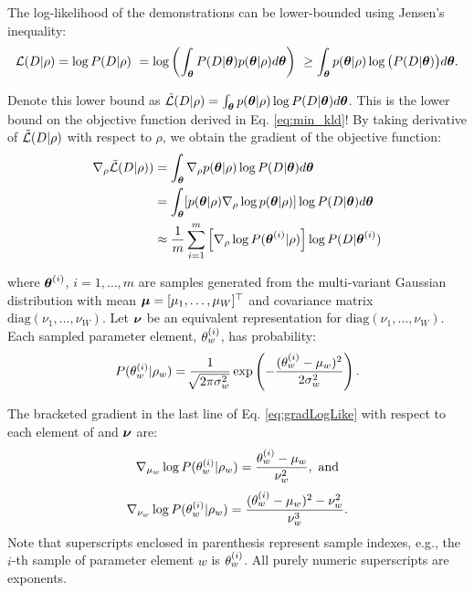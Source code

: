     \noindent
     The log-likelihood of the demonstrations can be lower-bounded using Jensen's inequality:
    \begin{equation*}
    \mathcal{L}(D|\rho ) = \log P(D|\rho)\
         = \log \left( \int_{\boldsymbol{\mathbb{\theta}}}P(D|\boldsymbol{\mathbb{\theta}}) p(\boldsymbol{\mathbb{\theta}} | \rho)d\boldsymbol{\mathbb{\theta}} \right)\ \ge \int_{\boldsymbol{\mathbb{\theta}}}
            p(\boldsymbol{\mathbb{\theta}}|\rho)\log \big( P(D|\boldsymbol{\mathbb{\theta}}) \big) d\boldsymbol{\mathbb{\theta}}.
    \end{equation*}

    \par
    Denote this lower bound as $\tilde{\mathcal{L}}(D|\rho)=\int_{\boldsymbol{\mathbb{\theta}}} p(\boldsymbol{\mathbb{\theta}} |\rho) \log P(D|\boldsymbol{\mathbb{\theta}})
    d\boldsymbol{\mathbb{\theta}}$. This is the lower bound on the objective function derived in Eq. \ref{eq:min_kld}! By taking
    derivative of $\tilde{\mathcal{L}}(D|\rho)$ with respect to $\rho$, we obtain the gradient of the objective function:
    \begin{equation}\label{eq:gradLogLike}
        \begin{aligned}
            \nabla_\rho \tilde{\mathcal{L}}(D|\rho)) & =
                \int_{\boldsymbol{\mathbb{\theta}}}\nabla_\rho p(\boldsymbol{\mathbb{\theta}}|\rho) \log P(D|\boldsymbol{\mathbb{\theta}})d\boldsymbol{\mathbb{\theta}}\\
            & = \int_{\boldsymbol{\mathbb{\theta}}}[ p(\boldsymbol{\mathbb{\theta}}|\rho) \nabla_\rho \log p(\boldsymbol{\mathbb{\theta}}|\rho) ] \log P(D|\boldsymbol{\mathbb{\theta}})d\boldsymbol{\mathbb{\theta}}\\
            &\approx \frac{1}{m} \sum_{ i=1}^m \left[\nabla_\rho \log P(\boldsymbol{\mathbb{\theta}}^{(i)}|\rho) \right] \log
                P(D|\boldsymbol{\mathbb{\theta}}^{(i)})
        \end{aligned}
    \end{equation}

    \noindent
    where $\boldsymbol{\mathbb{\theta}}^{(i)}$, $i=1,\ldots, m$ are samples generated from the multi-variant Gaussian distribution with
    mean $\boldsymbol{\mathbb{\mu}} = [\mu_1,\ldots, \mu_W]^\top$ and covariance matrix $\mbox{diag}\left(\nu_1,\ldots, \nu_W\right)$.
    Let $\boldsymbol{\mathbb{\nu}}$ be an equivalent representation for $\mbox{diag}\left(\nu_1,\ldots, \nu_W\right)$. Each sampled
    parameter element, $\theta_{w}^{(i)}$, has probability:
    \[
        P(\theta_{w}^{(i)} | \rho_{w}) = \frac{1}{\sqrt[]{2\pi \sigma_w^2}}\exp
            \left( -\frac{(\theta_w^{(i)}-\mu_w)^2}{2\sigma_w^2} \right).
    \]

    \par
    The bracketed gradient in the last line of Eq. \ref{eq:gradLogLike} with respect to each element of \vect{\mu} and
    $\boldsymbol{\mathbb{\nu}}$ are:
    \[
    \nabla_{\mu_{\paramIdx}}\log P(\paramElem^{(i)} | \rho_{\paramIdx}) =
        \frac{\paramElem^{(i)} - \mu_{\paramIdx}}{\nu_{\paramIdx}^2},\ \text{and}
    \]
    \[
    \nabla_{\nu_{w}}\log P(\theta_{w}^{(i)} | \rho_{w}) = \frac{(\theta_{w}^{(i)} - \mu_{w})^2 -
        \nu_{w}^2}{\nu_{w}^3}.
    \]
    Note that superscripts enclosed in parenthesis represent sample indexes, e.g., the $i$-th sample of parameter
    element $w$ is $\theta_{w}^{(i)}$. All purely numeric superscripts are exponents.

